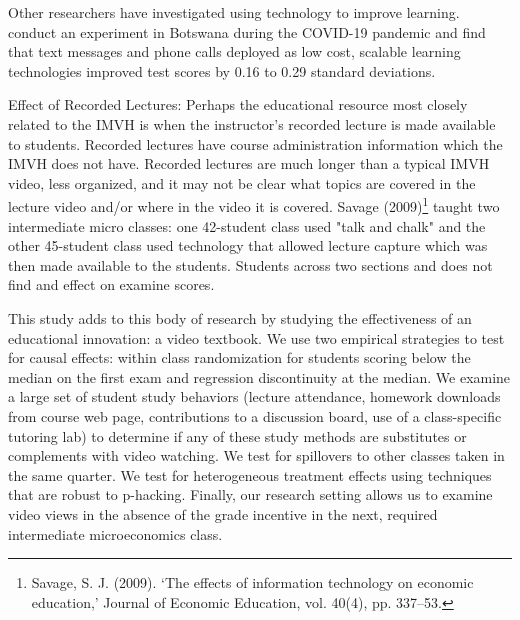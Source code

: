 \documentclass[12pt]{article}
\begin{document}
Other researchers have investigated using technology to improve learning. \textcite{nbbm2020} conduct an experiment in Botswana during the COVID-19 pandemic and find that text messages and phone calls deployed as low cost, scalable learning technologies improved test scores by 0.16 to 0.29 standard deviations. 

Effect of Recorded Lectures:  Perhaps the educational resource most closely related to the IMVH is when the instructor's recorded lecture is made available to students.  Recorded lectures have course administration information which the IMVH does not have. Recorded lectures are much longer than a typical IMVH video, less organized, and it may not be clear what topics are covered in the lecture video and/or where in the video it is covered.  Savage (2009)\footnote{Savage, S. J. (2009). ‘The effects of information technology on economic education,’ Journal of Economic Education, vol. 40(4), pp. 337–53.} taught two intermediate micro classes:  one 42-student class used "talk and chalk" and the other 45-student class used technology that allowed lecture capture which was then made available to the students. Students across two sections and does not find and effect on examine scores.  


This study adds to this body of research by studying the effectiveness of an educational innovation:  a video textbook.  We use two empirical strategies to test for causal effects:  within class randomization for students scoring below the median on the first exam and regression discontinuity at the median.  We examine a large set of student study behaviors (lecture attendance, homework downloads from course web page, contributions to a discussion board, use of a class-specific tutoring lab) to determine if any of these study methods are substitutes or complements with video watching.  We test for spillovers to other classes taken in the same quarter.  We test for heterogeneous treatment effects using techniques that are robust to p-hacking.  Finally, our research setting allows us to examine video views in the absence of the grade incentive in the next, required intermediate microeconomics class.  
\end{document}
